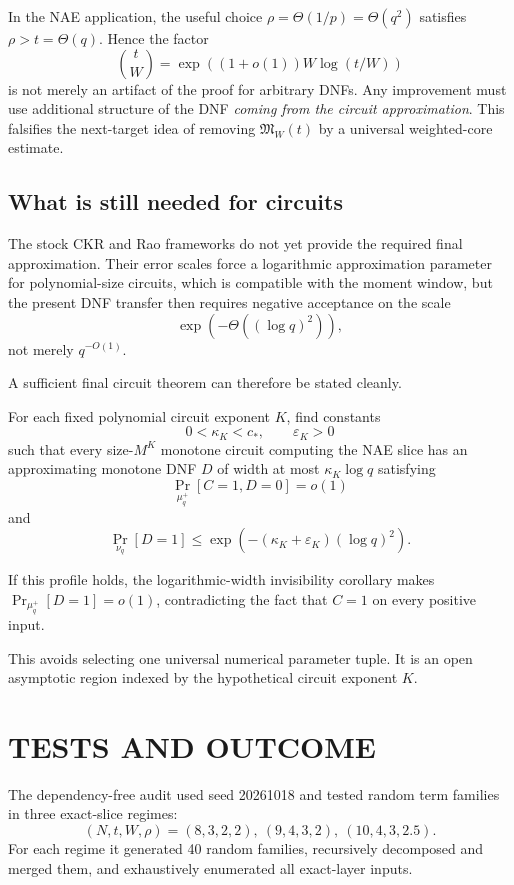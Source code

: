 \documentclass[11pt]{article}
\begin{document}
In the NAE application, the useful choice $\rho=\Theta(1/p)=\Theta(q^2)$ satisfies $\rho>t=\Theta(q)$. Hence the factor
\[
\binom tW=\exp((1+o(1))W\log(t/W))
\]
is not merely an artifact of the proof for arbitrary DNFs. Any improvement must use additional structure of the DNF \emph{coming from the circuit approximation}. This falsifies the next-target idea of removing $\mathfrak M_W(t)$ by a universal weighted-core estimate.

\subsection{What is still needed for circuits}
The stock CKR and Rao frameworks do not yet provide the required final approximation. Their error scales force a logarithmic approximation parameter for polynomial-size circuits, which is compatible with the moment window, but the present DNF transfer then requires negative acceptance on the scale
\[
\exp(-\Theta((\log q)^2)),
\]
not merely $q^{-O(1)}$.

A sufficient final circuit theorem can therefore be stated cleanly.

\begin{definition}
For each fixed polynomial circuit exponent $K$, find constants
\[
0<\kappa_K<c_*,\qquad \varepsilon_K>0
\]
such that every size-$M^K$ monotone circuit computing the NAE slice has an approximating monotone DNF $D$ of width at most $\kappa_K\log q$ satisfying
\[
\Pr_{\mu_q^+}[C=1,D=0]=o(1)
\]
and
\[
\Pr_{\nu_q}[D=1]\le
\exp\!\left(-(\kappa_K+\varepsilon_K)(\log q)^2\right).
\]
\end{definition}

If this profile holds, the logarithmic-width invisibility corollary makes $\Pr_{\mu_q^+}[D=1]=o(1)$, contradicting the fact that $C=1$ on every positive input.

This avoids selecting one universal numerical parameter tuple. It is an open asymptotic region indexed by the hypothetical circuit exponent $K$.

\section{TESTS AND OUTCOME}
The dependency-free audit used seed 20261018 and tested random term families in three exact-slice regimes:
\[
(N,t,W,\rho)=(8,3,2,2),\ (9,4,3,2),\ (10,4,3,2.5).
\]
For each regime it generated 40 random families, recursively decomposed and merged them, and exhaustively enumerated all exact-layer inputs.
\end{document}
